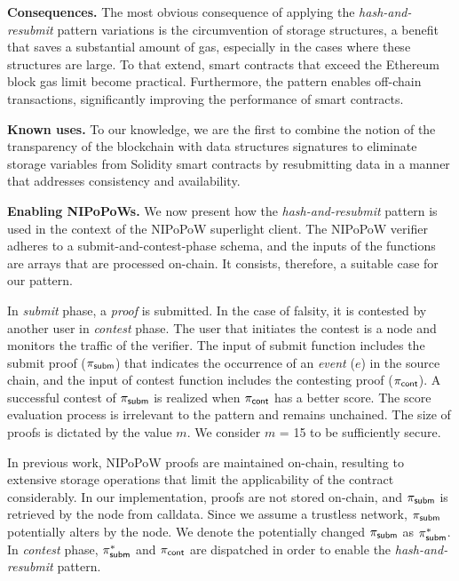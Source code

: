 \noindent \textbf{Consequences.} The most obvious consequence of applying the
\emph{hash-and-resubmit} pattern variations is the circumvention of storage
structures, a benefit that saves a substantial amount of gas, especially in the
cases where these structures are large. To that extend, smart contracts that
exceed the Ethereum block gas limit become practical. Furthermore, the pattern
enables off-chain transactions, significantly improving the performance of
smart contracts.

\noindent \textbf{Known uses.} To our knowledge, we are the first to combine
the notion of the transparency of the blockchain with data structures
signatures to eliminate storage variables from Solidity smart contracts by
resubmitting data in a manner that addresses consistency and availability.

\noindent \textbf{Enabling NIPoPoWs.} We now present how the
\emph{hash-and-resubmit} pattern is used in the context of the NIPoPoW
superlight client. The NIPoPoW verifier adheres to a submit-and-contest-phase
schema, and the inputs of the functions are arrays that are processed on-chain.
It consists, therefore, a suitable case for our pattern.

In \emph{submit} phase, a \emph{proof} is submitted. In the case of
falsity, it is contested by another user in \emph{contest} phase. The user that
initiates the contest is a node and monitors the traffic of the verifier.  The
input of \textsf{submit} function includes the submit proof ($\mathsf{\pi_{subm}}$) that
indicates the occurrence of an \emph{event} ($e$) in the source chain, and the
input of \textsf{contest} function includes the contesting proof ($\mathsf{\pi_{cont}}$). A
successful contest of $\mathsf{\pi_{subm}}$ is realized when $\mathsf{\pi_{cont}}$ has a better score. The
score evaluation process is irrelevant to the pattern and remains unchained.
The size of proofs is dictated by the value $m$. We consider $m$ = 15 to be
sufficiently secure.

In previous work, NIPoPoW proofs are maintained on-chain, resulting to
extensive storage operations that limit the applicability of the contract
considerably. In our implementation, proofs are not stored on-chain, and $\mathsf{\pi_{subm}}$
is retrieved by the node from calldata. Since we assume a trustless network,
$\mathsf{\pi_{subm}}$ potentially alters by the node. We denote the potentially changed $\mathsf{\pi_{subm}}$
as $\mathsf{\pi_{subm}^*}$. In \emph{contest} phase, $\mathsf{\pi_{subm}^*}$ and $\mathsf{\pi_{cont}}$ are dispatched in order
to enable the \emph{hash-and-resubmit} pattern.

